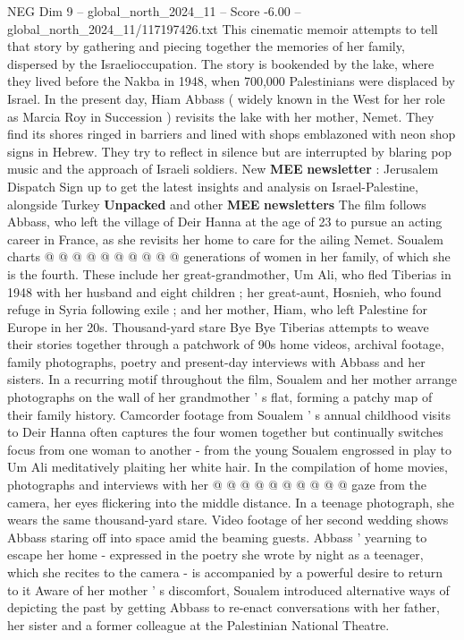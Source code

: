 \begin{textsample}{NEG Dim 9 – global\_north\_2024\_11 – Score -6.00 – global\_north\_2024\_11/117197426.txt}  \label{ex:f9_neg_055}
This cinematic memoir attempts to tell that story by gathering and piecing together the memories of her family, dispersed by the Israelioccupation.
The story is bookended by the lake, where they lived before the Nakba in 1948, when 700,000 Palestinians were displaced by Israel.
In the present day, Hiam Abbass ( widely known in the West for her role as Marcia Roy in Succession ) revisits the lake with her mother, Nemet.
They find its shores ringed in barriers and lined with shops emblazoned with neon shop signs in Hebrew.
They try to reflect in silence but are interrupted by blaring pop music and the approach of Israeli soldiers.
New \textbf{MEE} \textbf{newsletter} : Jerusalem Dispatch Sign up to get the latest insights and analysis on Israel-Palestine, alongside Turkey \textbf{Unpacked} and other \textbf{MEE} \textbf{newsletters} The film follows Abbass, who left the village of Deir Hanna at the age of 23 to pursue an acting career in France, as she revisits her home to care for the ailing Nemet.
Soualem charts @ @ @ @ @ @ @ @ @ @ generations of women in her family, of which she is the fourth.
These include her great-grandmother, Um Ali, who fled Tiberias in 1948 with her husband and eight children ; her great-aunt, Hosnieh, who found refuge in Syria following exile ; and her mother, Hiam, who left Palestine for Europe in her 20s.
Thousand-yard stare Bye Bye Tiberias attempts to weave their stories together through a patchwork of 90s home videos, archival footage, family photographs, poetry and present-day interviews with Abbass and her sisters.
In a recurring motif throughout the film, Soualem and her mother arrange photographs on the wall of her grandmother ' s flat, forming a patchy map of their family history.
Camcorder footage from Soualem ' s annual childhood visits to Deir Hanna often captures the four women together but continually switches focus from one woman to another - from the young Soualem engrossed in play to Um Ali meditatively plaiting her white hair.
In the compilation of home movies, photographs and interviews with her @ @ @ @ @ @ @ @ @ @ gaze from the camera, her eyes flickering into the middle distance.
In a teenage photograph, she wears the same thousand-yard stare.
Video footage of her second wedding shows Abbass staring off into space amid the beaming guests.
Abbass ' yearning to escape her home - expressed in the poetry she wrote by night as a teenager, which she recites to the camera - is accompanied by a powerful desire to return to it Aware of her mother ' s discomfort, Soualem introduced alternative ways of depicting the past by getting Abbass to re-enact conversations with her father, her sister and a former colleague at the Palestinian National Theatre.

\end{textsample}
